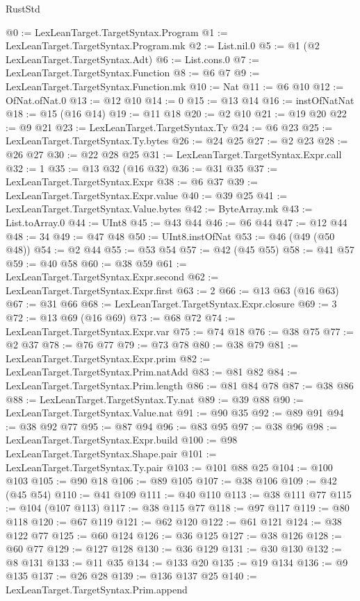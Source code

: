 \begin{lexlean}{RustStd}
\begin{coremodule}
{\begin{coremodule}
{{{{{{{{{{{{{{@0 := LexLeanTarget.TargetSyntax.Program
@1 := LexLeanTarget.TargetSyntax.Program.mk
@2 := List.nil.{0}
@5 := @1 (@2 LexLeanTarget.TargetSyntax.Adt)
@6 := List.cons.{0}
@7 := LexLeanTarget.TargetSyntax.Function
@8 := @6 @7
@9 := LexLeanTarget.TargetSyntax.Function.mk
@10 := Nat
@11 := @6 @10
@12 := OfNat.ofNat.{0}
@13 := @12 @10
@14 := 0
@15 := @13 @14
@16 := instOfNatNat
@18 := @15 (@16 @14)
@19 := @11 @18
@20 := @2 @10
@21 := @19 @20
@22 := @9 @21
@23 := LexLeanTarget.TargetSyntax.Ty
@24 := @6 @23
@25 := LexLeanTarget.TargetSyntax.Ty.bytes
@26 := @24 @25
@27 := @2 @23
@28 := @26 @27
@30 := @22 @28 @25
@31 := LexLeanTarget.TargetSyntax.Expr.call
@32 := 1
@35 := @13 @32 (@16 @32)
@36 := @31 @35
@37 := LexLeanTarget.TargetSyntax.Expr
@38 := @6 @37
@39 := LexLeanTarget.TargetSyntax.Expr.value
@40 := @39 @25
@41 := LexLeanTarget.TargetSyntax.Value.bytes
@42 := ByteArray.mk
@43 := List.toArray.{0}
@44 := UInt8
@45 := @43 @44
@46 := @6 @44
@47 := @12 @44
@48 := 34
@49 := @47 @48
@50 := UInt8.instOfNat
@53 := @46 (@49 (@50 @48))
@54 := @2 @44
@55 := @53 @54
@57 := @42 (@45 @55)
@58 := @41 @57
@59 := @40 @58
@60 := @38 @59
@61 := LexLeanTarget.TargetSyntax.Expr.second
@62 := LexLeanTarget.TargetSyntax.Expr.first
@63 := 2
@66 := @13 @63 (@16 @63)
@67 := @31 @66
@68 := LexLeanTarget.TargetSyntax.Expr.closure
@69 := 3
@72 := @13 @69 (@16 @69)
@73 := @68 @72
@74 := LexLeanTarget.TargetSyntax.Expr.var
@75 := @74 @18
@76 := @38 @75
@77 := @2 @37
@78 := @76 @77
@79 := @73 @78
@80 := @38 @79
@81 := LexLeanTarget.TargetSyntax.Expr.prim
@82 := LexLeanTarget.TargetSyntax.Prim.natAdd
@83 := @81 @82
@84 := LexLeanTarget.TargetSyntax.Prim.length
@86 := @81 @84 @78
@87 := @38 @86
@88 := LexLeanTarget.TargetSyntax.Ty.nat
@89 := @39 @88
@90 := LexLeanTarget.TargetSyntax.Value.nat
@91 := @90 @35
@92 := @89 @91
@94 := @38 @92 @77
@95 := @87 @94
@96 := @83 @95
@97 := @38 @96
@98 := LexLeanTarget.TargetSyntax.Expr.build
@100 := @98 LexLeanTarget.TargetSyntax.Shape.pair
@101 := LexLeanTarget.TargetSyntax.Ty.pair
@103 := @101 @88 @25
@104 := @100 @103
@105 := @90 @18
@106 := @89 @105
@107 := @38 @106
@109 := @42 (@45 @54)
@110 := @41 @109
@111 := @40 @110
@113 := @38 @111 @77
@115 := @104 (@107 @113)
@117 := @38 @115 @77
@118 := @97 @117
@119 := @80 @118
@120 := @67 @119
@121 := @62 @120
@122 := @61 @121
@124 := @38 @122 @77
@125 := @60 @124
@126 := @36 @125
@127 := @38 @126
@128 := @60 @77
@129 := @127 @128
@130 := @36 @129
@131 := @30 @130
@132 := @8 @131
@133 := @11 @35
@134 := @133 @20
@135 := @19 @134
@136 := @9 @135
@137 := @26 @28
@139 := @136 @137 @25
@140 := LexLeanTarget.TargetSyntax.Prim.append
}}}}}}}}}}}}}}
\end{coremodule}}
\end{coremodule}
\end{lexlean}
